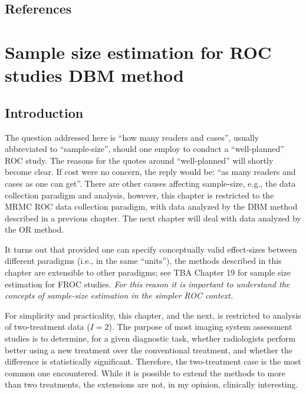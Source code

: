 \documentclass[
]{book}
\begin{document}
\hypertarget{ORApplications-references}{%
\section{References}\label{ORApplications-references}}

\hypertarget{RocSampleSizeDBM}{%
\chapter{Sample size estimation for ROC studies DBM method}\label{RocSampleSizeDBM}}

\hypertarget{RocSampleSizeDBM-introduction}{%
\section{Introduction}\label{RocSampleSizeDBM-introduction}}

The question addressed here is ``how many readers and cases'', usually abbreviated to ``sample-size'', should one employ to conduct a ``well-planned'' ROC study. The reasons for the quotes around ``well-planned'' will shortly become clear. If cost were no concern, the reply would be: ``as many readers and cases as one can get''. There are other causes affecting sample-size, e.g., the data collection paradigm and analysis, however, this chapter is restricted to the MRMC ROC data collection paradigm, with data analyzed by the DBM method described in a previous chapter. The next chapter will deal with data analyzed by the OR method.

It turns out that provided one can specify conceptually valid effect-sizes between different paradigms (i.e., in the same ``units''), the methods described in this chapter are extensible to other paradigms; see TBA Chapter 19 for sample size estimation for FROC studies. \emph{For this reason it is important to understand the concepts of sample-size estimation in the simpler ROC context.}

For simplicity and practicality, this chapter, and the next, is restricted to analysis of two-treatment data (\(I = 2\)). The purpose of most imaging system assessment studies is to determine, for a given diagnostic task, whether radiologists perform better using a new treatment over the conventional treatment, and whether the difference is statistically significant. Therefore, the two-treatment case is the most common one encountered. While it is possible to extend the methods to more than two treatments, the extensions are not, in my opinion, clinically interesting.
\end{document}
